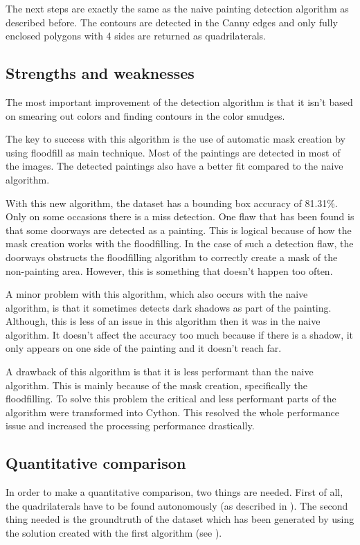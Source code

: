 The next steps are exactly the same as the naive painting detection algorithm as described before. The contours are detected in the Canny edges and only fully enclosed polygons with 4 sides are returned as quadrilaterals.

\subsection{Strengths and weaknesses}

The most important improvement of the detection algorithm is that it isn't based on smearing out colors and finding contours in the color smudges.

The key to success with this algorithm is the use of automatic mask creation by using floodfill as main technique. Most of the paintings are detected in most of the images. The detected paintings also have a better fit compared to the naive algorithm.

With this new algorithm, the dataset has a bounding box accuracy of 81.31\%. Only on some occasions there is a miss detection. One flaw that has been found is that some doorways are detected as a painting. This is logical because of how the mask creation works with the floodfilling. In the case of such a detection flaw, the doorways obstructs the floodfilling algorithm to correctly create a mask of the non-painting area. However, this is something that doesn't happen too often.

A minor problem with this algorithm, which also occurs with the naive algorithm, is that it sometimes detects dark shadows as part of the painting. Although, this is less of an issue in this algorithm then it was in the naive algorithm. It doesn't affect the accuracy too much because if there is a shadow, it only appears on one side of the painting and it doesn't reach far.

A drawback of this algorithm is that it is less performant than the naive algorithm. This is mainly because of the mask creation, specifically the floodfilling. To solve this problem the critical and less performant parts of the algorithm were transformed into Cython. This resolved the whole performance issue and increased the processing performance drastically. \cite{behnel2011cython}

\subsection{Quantitative comparison}
In order to make a quantitative comparison, two things are needed. First of all, the quadrilaterals have to be found autonomously (as described in ). The second thing needed is the groundtruth of the dataset which has been generated by using the solution created with the first algorithm (see ).

